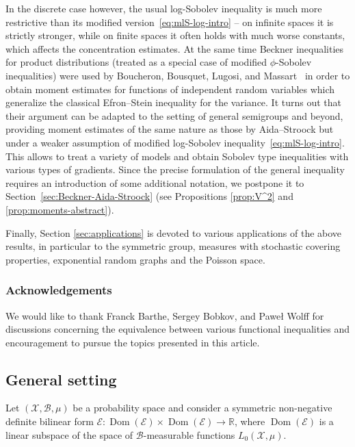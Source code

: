 \documentclass[a4paper]{amsart}
\theoremstyle{definition}
\theoremstyle{remark}
\numberwithin{equation}{section}
\newcommand*{\RR}{\mathbb{R}}
\newcommand{\calX}{\mathcal{X}}
\newcommand{\calB}{\mathcal{B}}
\DeclareMathOperator{\Dom}{Dom} %
\newcommand*{\calE}{\mathcal{E}}
\begin{document}
In the discrete case however, the usual log-Sobolev inequality is much more restrictive than its modified version~\eqref{eq:mlS-log-intro} -- on infinite spaces it is strictly stronger, while on finite spaces it often holds with much worse constants, which affects the concentration estimates.
At the same time Beckner inequalities for product distributions (treated as a special case of modified $\phi$-Sobolev inequalities) were used by Boucheron, Bousquet, Lugosi, and Massart~\cite{MR2123200} in order to obtain moment estimates for functions of independent random variables which generalize the classical Efron--Stein inequality for the variance.
It turns out that their argument can be adapted to the setting of general semigroups and beyond, providing moment estimates of the same nature as those by Aida--Stroock but under a weaker assumption of modified log-Sobolev inequality~\eqref{eq:mlS-log-intro}.
This allows to treat a variety of models and obtain Sobolev type inequalities with various types of gradients.
Since the precise formulation of the general inequality requires an introduction of some additional notation, we postpone it to Section~\ref{sec:Beckner-Aida-Stroock} (see Propositions \ref{prop:V^2} and \ref{prop:moments-abstract}).

Finally, Section \ref{sec:applications} is devoted to various applications of the above results, in particular to the symmetric group, measures with stochastic covering properties, exponential random graphs and the Poisson space.


\subsubsection*{Acknowledgements}
We would like to thank Franck Barthe, Sergey Bobkov, and Pawe{\l} Wolff for discussions concerning the equivalence between various functional inequalities and encouragement to pursue the topics presented in this article.

\subsection{General setting}
\label{sec:setting}

Let $(\calX,\calB,\mu)$ be a probability space and consider a symmetric non-negative definite bilinear form $\mathcal{E}\colon \Dom(\calE)\times \Dom(\calE) \to \RR$, where  $\Dom(\calE)$ is a linear subspace of the space of $\mathcal{B}$-measurable functions $L_0(\calX,\mu)$.
\end{document}
